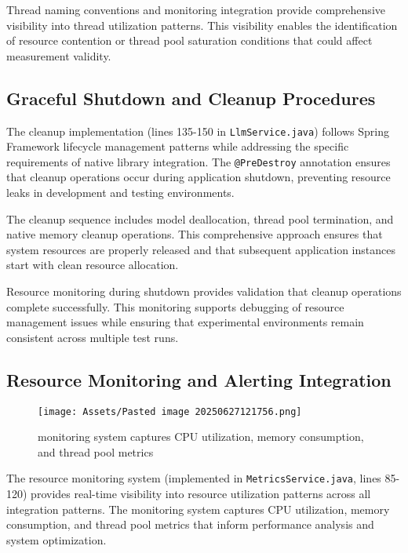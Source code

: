 Thread naming conventions and monitoring integration provide comprehensive visibility into thread utilization patterns. This visibility enables the identification of resource contention or thread pool saturation conditions that could affect measurement validity.

\subsection{Graceful Shutdown and Cleanup Procedures}

The cleanup implementation (lines 135-150 in \texttt{LlmService.java}) follows Spring Framework lifecycle management patterns while addressing the specific requirements of native library integration. The \texttt{@PreDestroy} annotation ensures that cleanup operations occur during application shutdown, preventing resource leaks in development and testing environments.


The cleanup sequence includes model deallocation, thread pool termination, and native memory cleanup operations. This comprehensive approach ensures that system resources are properly released and that subsequent application instances start with clean resource allocation.

Resource monitoring during shutdown provides validation that cleanup operations complete successfully. This monitoring supports debugging of resource management issues while ensuring that experimental environments remain consistent across multiple test runs.

\subsection{Resource Monitoring and Alerting Integration}

\begin{figure}[H]
    \centering
    \texttt{[image: Assets/Pasted image 20250627121756.png]}
    \caption{monitoring system captures CPU utilization, memory consumption, and thread pool metrics}
\end{figure}

The resource monitoring system (implemented in \texttt{MetricsService.java}, lines 85-120) provides real-time visibility into resource utilization patterns across all integration patterns. The monitoring system captures CPU utilization, memory consumption, and thread pool metrics that inform performance analysis and system optimization.

